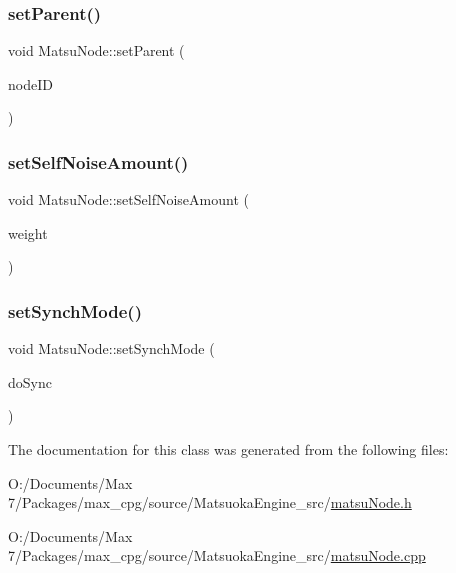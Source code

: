 \mbox{\label{classMatsuNode_ab357c154c95d3e289921cc79ef8cf94e}} 
\subsubsection{\texorpdfstring{set\+Parent()}{setParent()}}
{\footnotesize\ttfamily void Matsu\+Node\+::set\+Parent (\begin{DoxyParamCaption}\item[{unsigned}]{node\+ID }\end{DoxyParamCaption})}

\mbox{\label{classMatsuNode_abc2600fa8de6d090296ee5f152a01916}} 
\subsubsection{\texorpdfstring{set\+Self\+Noise\+Amount()}{setSelfNoiseAmount()}}
{\footnotesize\ttfamily void Matsu\+Node\+::set\+Self\+Noise\+Amount (\begin{DoxyParamCaption}\item[{double}]{weight }\end{DoxyParamCaption})}

\mbox{\label{classMatsuNode_a31c979f10f4c1482204ec19a2868caf1}} 
\subsubsection{\texorpdfstring{set\+Synch\+Mode()}{setSynchMode()}}
{\footnotesize\ttfamily void Matsu\+Node\+::set\+Synch\+Mode (\begin{DoxyParamCaption}\item[{\mbox{\hyperlink{classMatsuNode_a725e228db39b8842f851ddf88f640bed}{synch\+Mode}}}]{do\+Sync }\end{DoxyParamCaption})}



The documentation for this class was generated from the following files\+:\begin{DoxyCompactItemize}
\item 
O\+:/\+Documents/\+Max 7/\+Packages/max\+\_\+cpg/source/\+Matsuoka\+Engine\+\_\+src/\mbox{\hyperlink{matsuNode_8h}{matsu\+Node.\+h}}\item 
O\+:/\+Documents/\+Max 7/\+Packages/max\+\_\+cpg/source/\+Matsuoka\+Engine\+\_\+src/\mbox{\hyperlink{matsuNode_8cpp}{matsu\+Node.\+cpp}}\end{DoxyCompactItemize}
